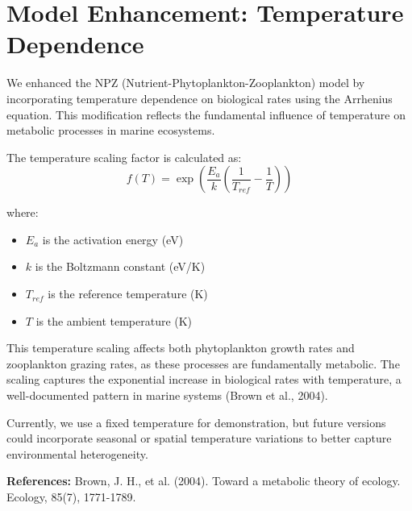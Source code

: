 \section{Model Enhancement: Temperature Dependence}

We enhanced the NPZ (Nutrient-Phytoplankton-Zooplankton) model by incorporating temperature dependence on biological rates using the Arrhenius equation. This modification reflects the fundamental influence of temperature on metabolic processes in marine ecosystems.

The temperature scaling factor is calculated as:
\[ f(T) = \exp(\frac{E_a}{k}(\frac{1}{T_{ref}} - \frac{1}{T})) \]

where:
\begin{itemize}
\item $E_a$ is the activation energy (eV)
\item $k$ is the Boltzmann constant (eV/K)
\item $T_{ref}$ is the reference temperature (K)
\item $T$ is the ambient temperature (K)
\end{itemize}

This temperature scaling affects both phytoplankton growth rates and zooplankton grazing rates, as these processes are fundamentally metabolic. The scaling captures the exponential increase in biological rates with temperature, a well-documented pattern in marine systems (Brown et al., 2004).

Currently, we use a fixed temperature for demonstration, but future versions could incorporate seasonal or spatial temperature variations to better capture environmental heterogeneity.

\textbf{References:}
Brown, J. H., et al. (2004). Toward a metabolic theory of ecology. Ecology, 85(7), 1771-1789.
